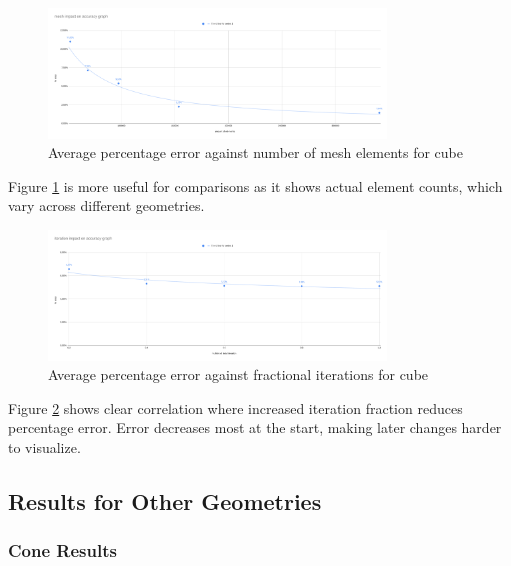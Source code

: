\documentclass[12pt,a4paper]{article}
\begin{document}
\begin{figure}[H]
    \centering
    \includegraphics[width=0.8\textwidth]{image14.png}
    \caption{Average percentage error against number of mesh elements for cube}
    \label{fig:cube_elements_error}
\end{figure}

Figure \ref{fig:cube_elements_error} is more useful for comparisons as it shows actual element counts, which vary across different geometries.

\begin{figure}[H]
    \centering
    \includegraphics[width=0.8\textwidth]{image5.png}
    \caption{Average percentage error against fractional iterations for cube}
    \label{fig:cube_iterations_error}
\end{figure}

Figure \ref{fig:cube_iterations_error} shows clear correlation where increased iteration fraction reduces percentage error. Error decreases most at the start, making later changes harder to visualize.

\subsection{Results for Other Geometries}

\subsubsection{Cone Results}
\end{document}
